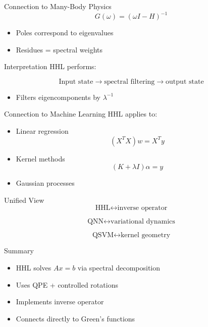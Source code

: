 \documentclass{beamer}
\begin{document}
\begin{frame}{Connection to Many-Body Physics}
\[
G(\omega) = (\omega I - H)^{-1}
\]

\begin{itemize}
\item Poles correspond to eigenvalues
\item Residues = spectral weights
\end{itemize}
\end{frame}

\begin{frame}{Interpretation}
HHL performs:

\[
\text{Input state} \rightarrow \text{spectral filtering} \rightarrow \text{output state}
\]

\begin{itemize}
\item Filters eigencomponents by $\lambda^{-1}$
\end{itemize}
\end{frame}

\begin{frame}{Connection to Machine Learning}
HHL applies to:

\begin{itemize}
\item Linear regression
\[
(X^TX)w = X^Ty
\]
\item Kernel methods
\[
(K+\lambda I)\alpha = y
\]
\item Gaussian processes
\end{itemize}
\end{frame}

\begin{frame}{Unified View}
\[
\text{HHL} \leftrightarrow \text{inverse operator}
\]

\[
\text{QNN} \leftrightarrow \text{variational dynamics}
\]

\[
\text{QSVM} \leftrightarrow \text{kernel geometry}
\]
\end{frame}

\begin{frame}{Summary}
\begin{itemize}
\item HHL solves $Ax=b$ via spectral decomposition
\item Uses QPE + controlled rotations
\item Implements inverse operator
\item Connects directly to Green's functions
\end{itemize}
\end{frame}
\end{document}
